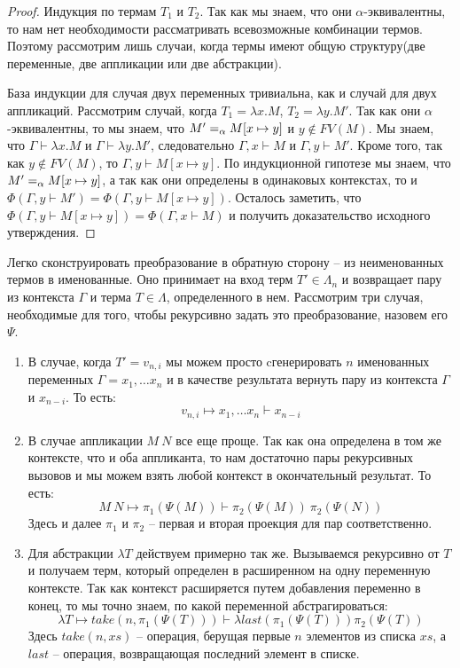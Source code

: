 \begin{proof}
  Индукция по термам $T_{1}$ и $T_{2}$. Так как мы знаем, что они $\alpha$-эквивалентны, то нам нет необходимости рассматривать всевозможные комбинации термов. Поэтому рассмотрим лишь случаи, когда термы имеют общую структуру(две переменные, две аппликации или две абстракции).

  База индукции для случая двух переменных тривиальна, как и случай для двух аппликаций. Рассмотрим случай, когда $T_{1} = \lambda x.M$, $T_{2} = \lambda y.M'$. Так как они $\alpha$-эквивалентны, то мы знаем, что $M' =_{\alpha} M[x \mapsto y]$ и $y \notin FV(M)$. Мы знаем, что $\Gamma \vdash \lambda x.M$ и $\Gamma \vdash \lambda y.M'$, следовательно $\Gamma, x \vdash M$ и $\Gamma, y \vdash M'$. Кроме того, так как $y \notin FV(M)$, то $\Gamma, y \vdash M[x \mapsto y]$. По индукционной гипотезе мы знаем, что $M' =_{\alpha} M[x \mapsto y]$, а так как они определены в одинаковых контекстах, то и $\Phi(\Gamma, y \vdash M') = \Phi(\Gamma, y \vdash M[x \mapsto y])$. Осталось заметить, что $\Phi(\Gamma, y \vdash M[x \mapsto y]) = \Phi(\Gamma, x \vdash M)$ и получить доказательство исходного утверждения.
\end{proof}

Легко сконструировать преобразование в обратную сторону -- из неименованных термов в именованные. Оно принимает на вход терм $T' \in \Lambda_{n}$ и возвращает пару из контекста $\Gamma$ и терма $T \in \Lambda$, определенного в нем. Рассмотрим три случая, необходимые для того, чтобы рекурсивно задать это преобразование, назовем его $\Psi$.

\begin{enumerate}
  \item В случае, когда $T' = v_{n, i}$ мы можем просто cгенерировать $n$ именованных переменных $\Gamma = x_{1}, \dots x_{n}$ и в качестве результата вернуть пару из контекста $\Gamma$ и $x_{n - i}$. То есть:
  $$ v_{n, i} \mapsto x_{1}, \dots x_{n} \vdash x_{n-i} $$

  \item В случае аппликации $M\ N$ все еще проще. Так как она определена в том же контексте, что и оба аппликанта, то нам достаточно пары рекурсивных вызовов и мы можем взять любой контекст в окончательный результат. То есть:
  $$ M\ N \mapsto \pi_{1}(\Psi(M)) \vdash \pi_{2}(\Psi(M))\ \pi_{2}(\Psi(N))$$
  Здесь и далее $\pi_{1}$ и $\pi_{2}$ -- первая и вторая проекция для пар соответственно.

  \item Для абстракции $\lambda T$ действуем примерно так же. Вызываемся рекурсивно от $T$ и получаем терм, который определен в расширенном на одну переменную контексте. Так как контекст расширяется путем добавления переменно в конец, то мы точно знаем, по какой переменной абстрагироваться:
  $$ \lambda T \mapsto take(n, \pi_{1}(\Psi(T))) \vdash \lambda last(\pi_{1}(\Psi(T))) \pi_{2}(\Psi(T)) $$
  Здесь $take(n, xs)$ -- операция, берущая первые $n$ элементов из списка $xs$, а $last$ -- операция, возвращающая последний элемент в списке.
\end{enumerate}

